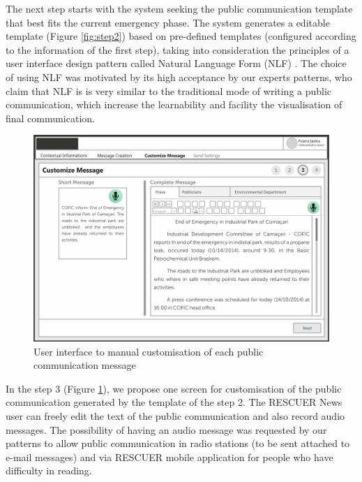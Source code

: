 The next step starts with the system seeking the public communication template that best fits
the current emergency phase. The system generates a editable template (Figure \ref{fig:step2}) based on pre-defined templates (configured according to the information of the first step), taking into consideration the principles of a user interface design pattern called Natural Language Form (NLF) \citep{nlf}. The choice of using NLF was motivated by its high acceptance by our experts patterns, who claim that NLF is is very similar to the traditional mode of writing a public communication, which increase the learnability and facility the visualisation of final communication.

\begin{figure}
\centering
\includegraphics[width=\linewidth]{images/step3.png}
\caption{User interface to manual customisation of each public communication message}
\label{fig:step3}
\end{figure}

In the step 3 (Figure \ref{fig:step3}), we propose one screen for customisation of the public communication generated by the template of the step 2. The RESCUER News user can freely edit the text of the public communication and also record audio messages. The possibility of having an audio message was requested by our patterns to allow public communication in radio stations (to be sent attached to e-mail messages) and via RESCUER mobile application for people who have difficulty in reading.

